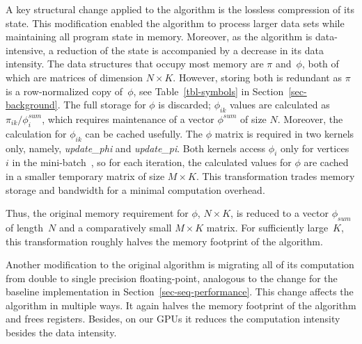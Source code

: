 A key structural change applied to the algorithm is the lossless compression of
its state. This modification enabled the algorithm to process larger data sets
while maintaining all program state in memory. Moreover, as the algorithm is
data-intensive, a reduction of the state is accompanied by a decrease in its
data intensity.
%
The data structures that occupy most memory are $\pi$ and~$\phi$, both of
which are matrices of dimension ${N}\times{K}$. However, storing both
is redundant as $\pi$ is a row-normalized copy of~$\phi$, see
Table~\ref{tbl-symbols} in Section~\ref{sec-background}. The full storage for
$\phi$ is discarded; $\phi_{ik}$ values are calculated as
$\pi_{ik}/\phi^{sum}_i$, which requires maintenance of a vector
$\phi^{sum}$ of size $N$.
Moreover, the calculation for $\phi_{ik}$ can be cached usefully.
%
The $\phi$ matrix is required in two kernels only, namely, \textit{update\_phi} and
\textit{update\_pi}. Both kernels access $\phi_i$ only for vertices~$i$ in the
mini-batch~\Minibatch, so for each iteration, the calculated values for $\phi$ are cached
in a smaller temporary matrix of size
$M\times{K}$.
%
%
This transformation trades memory storage and
bandwidth for a minimal computation overhead.
%

Thus, the original memory requirement for $\phi$, ${N}\times{K}$, is
reduced to a vector $\phi_{sum}$ of length~$N$ and a comparatively small
$M\times{K}$ matrix. For sufficiently large~$K$, this transformation roughly
halves the memory footprint of the algorithm.

Another modification to the original algorithm is migrating all of its
computation from double to single precision floating-point, analogous to the change
for the baseline implementation in Section~\ref{sec-seq-performance}.
%
This change affects the algorithm in multiple ways.
It again halves the memory
footprint of the algorithm and frees registers.
Besides, on our GPUs it
reduces
the computation intensity besides the data intensity.

